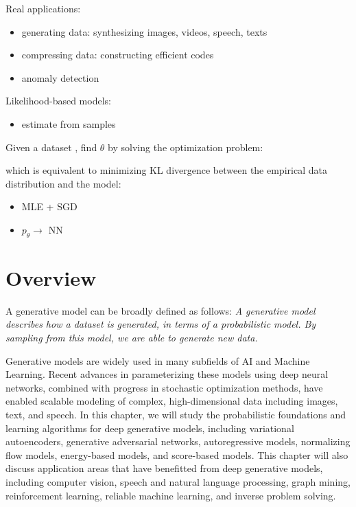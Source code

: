 Real applications:

\begin{itemize}
\setlength{\parskip}{0pt}
\item
generating data: synthesizing images, videos, speech, texts
\item
compressing data: constructing efficient codes
\item
anomaly detection
\end{itemize}

Likelihood-based models:

\begin{itemize}
\setlength{\parskip}{0pt}
\item
estimate from samples
\end{itemize}

Given a dataset , find $\theta$ by solving the optimization problem:

which is equivalent to minimizing KL divergence between the empirical data distribution 
and the model:

\begin{itemize}
\setlength{\parskip}{0pt}
\item
MLE + SGD

\item
$p_\theta \rightarrow$ NN
\end{itemize}


\section{Overview}

A generative model can be broadly defined as follows:
{\em A generative model describes how a dataset is generated, in terms of a probabilistic 
model. By sampling from this model, we are able to generate new data.}

Generative models are widely used in many subfields of AI and Machine Learning. Recent 
advances in parameterizing these models using deep neural networks, combined with 
progress in stochastic optimization methods, have enabled scalable modeling of complex, 
high-dimensional data including images, text, and speech. In this chapter, we will 
study the probabilistic foundations and learning algorithms for deep generative models, 
including variational autoencoders, generative adversarial networks, autoregressive 
models, normalizing flow models, energy-based models, and score-based models. This 
chapter will also discuss application areas that have benefitted from deep generative 
models, including computer vision, speech and natural language processing, graph mining, 
reinforcement learning, reliable machine learning, and inverse problem solving.

